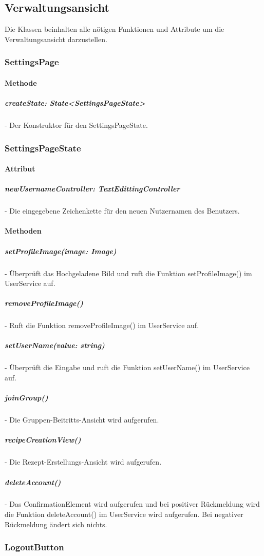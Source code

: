 \documentclass[parskip=full]{scrartcl}
\begin{document}
        \newpage

\subsection{Verwaltungsansicht}
    Die Klassen beinhalten alle nötigen Funktionen und Attribute um die Verwaltungsansicht darzustellen.

    \subsubsection{SettingsPage}
        \paragraph*{Methode}
            \subparagraph*{createState: State<SettingsPageState>} - Der Konstruktor für den SettingsPageState.
    
    \subsubsection{SettingsPageState}
        \paragraph*{Attribut}
            \subparagraph*{newUsernameController: TextEdittingController} - Die eingegebene Zeichenkette für den neuen Nutzernamen des Benutzers.

        \paragraph*{Methoden}
            \subparagraph*{setProfileImage(image: Image)} - Überprüft das Hochgeladene Bild und ruft die Funktion setProfileImage() im UserService auf.
            \subparagraph*{removeProfileImage()} - Ruft die Funktion removeProfileImage() im UserService auf.
            \subparagraph*{setUserName(value: string)} - Überprüft die Eingabe und ruft die Funktion setUserName() im UserService auf.
            \subparagraph*{joinGroup()} - Die Gruppen-Beitritts-Ansicht wird aufgerufen.
            \subparagraph*{recipeCreationView()} - Die Rezept-Erstellungs-Ansicht wird aufgerufen.
            \subparagraph*{deleteAccount()} - Das ConfirmationElement wird aufgerufen und bei positiver Rückmeldung wird die Funktion deleteAccount() im UserService wird aufgerufen. Bei negativer Rückmeldung ändert sich nichts. 
    
    \subsubsection{LogoutButton}
\end{document}
